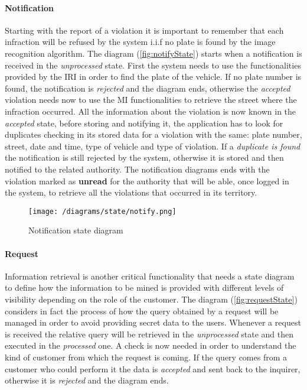 		\paragraph{Notification}
			Starting with the report of a violation it is important to remember that each infraction will be refused by the system i.i.f no plate is found by the image recognition algorithm. The diagram (\autoref{fig:notifyState}) starts when a notification is received in the \textit{unprocessed} state. First the system needs to use the functionalities provided by the IRI in order to find the plate of the vehicle. If no plate number is found, the notification is \textit{rejected} and the diagram ends, otherwise the \textit{accepted} violation needs now to use the MI functionalities to retrieve the street where the infraction occurred. All the information about the violation is now known in the \textit{accepted} state, before storing and notifying it, the application has to look for duplicates checking in its stored data for a violation with the same: plate number, street, date and time, type of vehicle and type of violation. If a \textit{duplicate is found} the notification is still rejected by the system, otherwise it is stored and then notified to the related authority. The notification diagrams ends with the violation marked as \textbf{unread} for the authority that will be able, once logged in the system, to retrieve all the violations that occurred in its territory.
			
			\vspace{0.3cm}
			\begin{figure}[h]
				\centering
				\texttt{[image: /diagrams/state/notify.png]}
				\caption{\label{fig:notifyState}Notification state diagram}
			\end{figure}
		
		\paragraph{Request}
			Information retrieval is another critical functionality that needs a state diagram to define how the information to be mined is provided with different levels of visibility depending on the role of the customer. The diagram (\autoref{fig:requestState}) considers in fact the process of how the query obtained by a request will be managed in order to avoid providing secret data to the users. Whenever a request is received the relative query will be retrieved in the \textit{unprocessed} state and then executed in the \textit{processed} one. A check is now needed in order to understand the kind of customer from which the request is coming. If the query comes from a customer who could perform it the data is \textit{accepted} and sent back to the inquirer, otherwise it is \textit{rejected} and the diagram ends.
			
